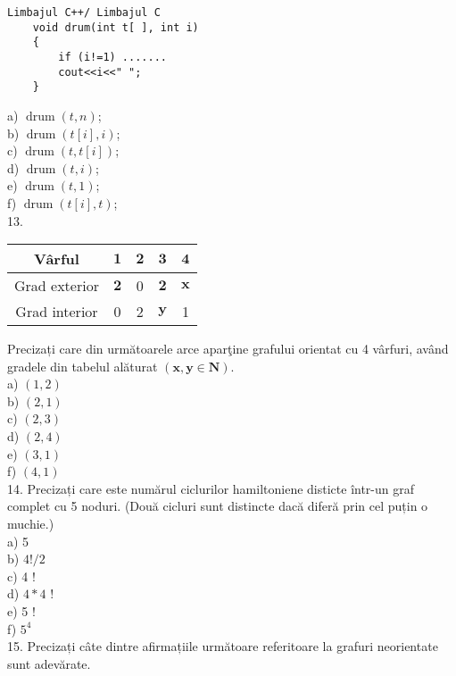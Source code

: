 \begin{verbatim}
Limbajul C++/ Limbajul C
    void drum(int t[ ], int i)
    {
        if (i!=1) .......
        cout<<i<<" ";
    }
\end{verbatim}

a) $\operatorname{drum}(t, n)$;\\
b) $\operatorname{drum}(t[i], i)$;\\
c) $\operatorname{drum}(t, t[i])$;\\
d) $\operatorname{drum}(t, i)$;\\
e) $\operatorname{drum}(t, 1)$;\\
f) $\operatorname{drum}(t[i], t)$;\\
13.

\begin{center}
\begin{tabular}{|c|c|c|c|c|}
\hline
Vârful & $\mathbf{1}$ & $\mathbf{2}$ & $\mathbf{3}$ & $\mathbf{4}$ \\
\hline
Grad exterior & $\mathbf{2}$ & 0 & $\mathbf{2}$ & $\mathbf{x}$ \\
\hline
Grad interior & 0 & 2 & $\mathbf{y}$ & 1 \\
\hline
\end{tabular}
\end{center}

Precizați care din următoarele arce aparţine grafului orientat cu 4 vârfuri, având gradele din tabelul alăturat $(\mathbf{x}, \mathbf{y} \in \mathbf{N})$.\\
a) $(1,2)$\\
b) $(2,1)$\\
c) $(2,3)$\\
d) $(2,4)$\\
e) $(3,1)$\\
f) $(4,1)$\\
14. Precizați care este numărul ciclurilor hamiltoniene disticte într-un graf complet cu 5 noduri. (Două cicluri sunt distincte dacă diferă prin cel puțin o muchie.)\\
a) 5\\
b) $4!/ 2$\\
c) 4 !\\
d) $4 * 4$ !\\
e) 5 !\\
f) $5^{4}$\\
15. Precizați câte dintre afirmațiile următoare referitoare la grafuri neorientate sunt adevărate.

